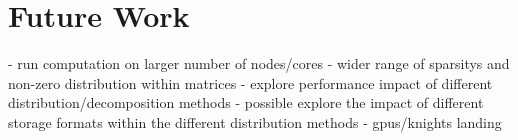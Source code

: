 \section{Future Work}\label{sec:dspmv-futurework}
- run computation on larger number of nodes/cores
- wider range of sparsitys and non-zero distribution within matrices
- explore performance impact of different distribution/decomposition methods
- possible explore the impact of different storage formats within the different distribution methods
- gpus/knights landing